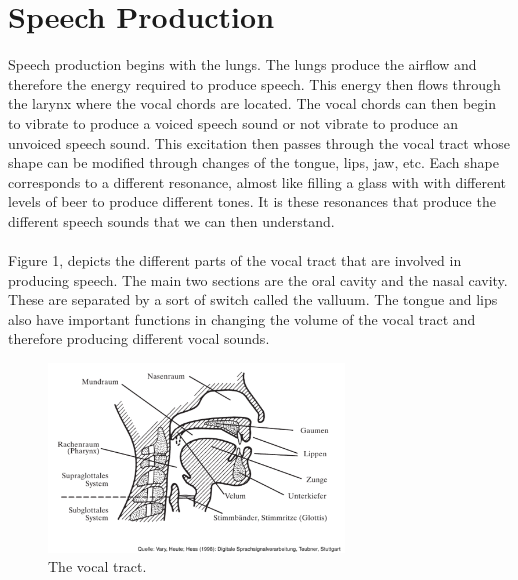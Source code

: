 \clearpage
\section{Speech Production}
\label{Speech Production}

Speech production begins with the lungs. The lungs produce the airflow and therefore the energy required to produce speech. This energy then flows through the larynx where the vocal chords are located.  The vocal chords can then begin to vibrate to produce a voiced speech sound or not vibrate to produce an unvoiced speech sound.  This excitation then passes through the vocal tract whose shape can be modified through changes of the tongue, lips, jaw, etc. Each shape corresponds to a different resonance, almost like filling a glass with with different levels of beer to produce different tones.  It is these resonances that produce the different speech sounds that we can then understand.\\
\\
Figure 1, depicts the different parts of the vocal tract that are involved in producing speech. The main two sections are the oral cavity and the nasal cavity. These are separated by a sort of switch called the valluum. The tongue and lips also have important functions in changing the volume of the vocal tract and therefore producing different vocal sounds.\\

\begin{figure}
    \includegraphics[width=0.7\textwidth]{Pictures/Chapter1_Lesson2/vokaltrakt-eps-converted-to.pdf}
    \caption{The vocal tract.}
\end{figure}

